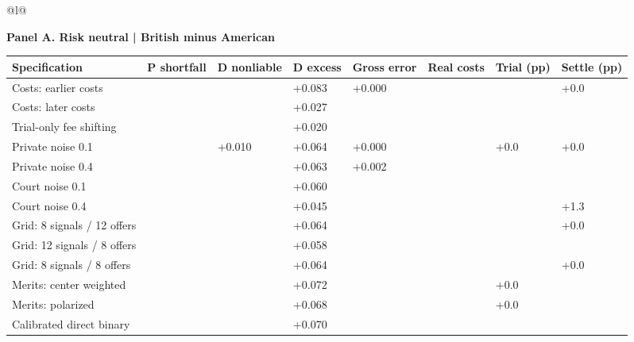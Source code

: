 \documentclass[10pt,border=5pt]{standalone}
\begin{document}
\begin{tabular}{@{}l@{}}
\begin{minipage}{18.400cm}
\small
\setlength{\tabcolsep}{3pt}
\renewcommand{\arraystretch}{1.25}
\noindent\textbf{Panel A. Risk neutral | British minus American}\par\smallskip
\begin{tabular}{@{}>{\raggedright\arraybackslash}p{5.454cm}>{\centering\arraybackslash}p{1.632cm}>{\centering\arraybackslash}p{1.632cm}>{\centering\arraybackslash}p{1.567cm}>{\centering\arraybackslash}p{1.567cm}>{\centering\arraybackslash}p{1.567cm}>{\centering\arraybackslash}p{1.610cm}>{\centering\arraybackslash}p{1.610cm}@{}}
\toprule
\textbf{Specification} & \textbf{P shortfall} & \textbf{D nonliable} & \textbf{D excess} & \textbf{Gross error} & \textbf{Real costs} & \textbf{Trial (pp)} & \textbf{Settle (pp)}\\\midrule
Costs: earlier costs & -0.061 & -0.029 & +0.083 & +0.000 & -0.055 & -8.4 & +0.0\\
Costs: later costs & -0.056 & -0.031 & +0.027 & -0.007 & -0.093 & -14.4 & -20.7\\
Trial-only fee shifting & -0.004 & -0.047 & +0.020 & -0.005 & -0.057 & -9.6 & -8.3\\
Private noise 0.1 & -0.050 & +0.010 & +0.064 & +0.000 & -0.000 & +0.0 & +0.0\\
Private noise 0.4 & -0.051 & -0.078 & +0.063 & +0.002 & -0.103 & -17.0 & -0.4\\
Court noise 0.1 & -0.050 & -0.038 & +0.060 & -0.001 & -0.071 & -3.1 & -18.3\\
Court noise 0.4 & -0.048 & -0.118 & +0.045 & -0.055 & -0.175 & -29.8 & +1.3\\
Grid: 8 signals / 12 offers & -0.041 & -0.047 & +0.064 & -0.002 & -0.073 & -11.7 & +0.0\\
Grid: 12 signals / 8 offers & -0.063 & -0.009 & +0.058 & -0.001 & -0.038 & -5.8 & -3.8\\
Grid: 8 signals / 8 offers & -0.041 & -0.047 & +0.064 & -0.002 & -0.073 & -11.7 & +0.0\\
Merits: center weighted & -0.063 & -0.060 & +0.072 & -0.031 & -0.108 & +0.0 & -47.5\\
Merits: polarized & -0.053 & -0.018 & +0.068 & -0.000 & -0.025 & +0.0 & -7.7\\
Calibrated direct binary & -0.087 & -0.059 & +0.070 & -0.003 & -0.061 & -8.1 & -13.6\\
\bottomrule\end{tabular}
\end{minipage}

\end{tabular}
\end{document}
